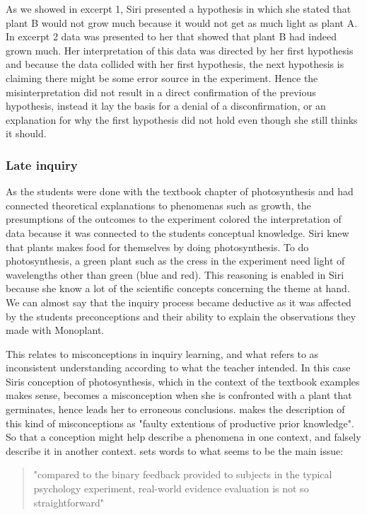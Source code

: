 As we showed in excerpt 1, Siri presented a hypothesis in which she stated that plant B would not grow much because it would not get as much light as plant A. In excerpt 2 data was presented to her that showed that plant B had indeed grown much. Her interpretation of this data was directed by her first hypothesis and because the data collided with her first hypothesis, the next hypothesis is claiming there might be some error source in the experiment. Hence the misinterpretation did not result in a direct confirmation of the previous hypothesis, instead it lay the basis for a denial of a disconfirmation, or an explanation for why the first hypothesis did not hold even though she still thinks it should.

\subsubsection*{Late inquiry}
As the students were done with the textbook chapter of photosynthesis and had connected theoretical explanations to phenomenas such as growth, the presumptions of the outcomes to the experiment colored the interpretation of data because it was connected to the students conceptual knowledge. Siri knew that plants makes food for themselves by doing photosynthesis. To do photosynthesis, a green plant such as the cress in the experiment need light of wavelengths other than green (blue and red). This reasoning is enabled in Siri because she know a lot of the scientific concepts concerning the theme at hand. We can almost say that the inquiry process became deductive as it was affected by the students preconceptions and their ability to explain the observations they made with Monoplant. 

This relates to misconceptions in inquiry learning, and what \citet{gomez2008elementary} refers to as inconsistent understanding according to what the teacher intended. In this case Siris conception of photosynthesis, which in the context of the textbook examples makes sense, becomes a misconception when she is confronted with a plant that germinates, hence leads her to erroneous conclusions. \citet{smith1994misconceptions} makes the description of this kind of misconceptions as "faulty extentions of productive prior knowledge". So that a conception might help describe a phenomena in one context, and falsely describe it in another context. \citeauthor{klahr1993heuristics} sets words to what seems to be the main issue: 

\begin{quote}"compared to the binary feedback provided to subjects in the typical psychology experiment, real-world evidence evaluation is not so straightforward" \citetext{\citet[p. 114]{klahr1993heuristics}, referenced in \citealp{de1998scientific}}
\end{quote}

